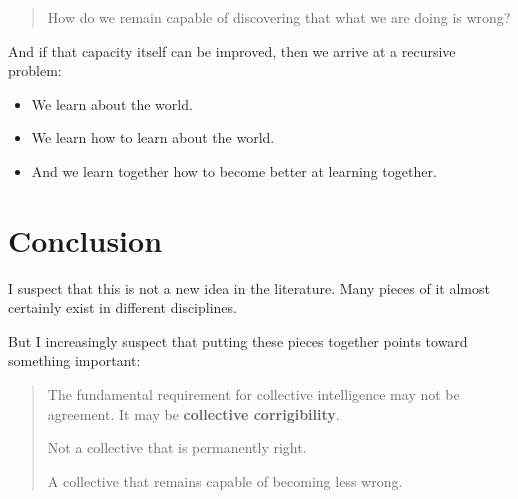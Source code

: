\documentclass{article}
\begin{document}
\begin{quote}
    How do we remain capable of discovering that what we are doing is wrong?
\end{quote}

And if that capacity itself can be improved, then we arrive at a recursive problem:

\begin{itemize}
    \item We learn about the world.
    \item We learn how to learn about the world.
    \item And we learn together how to become better at learning together.
\end{itemize}

\section*{Conclusion}

I suspect that this is not a new idea in the literature. Many pieces of it almost certainly exist in different disciplines.

But I increasingly suspect that putting these pieces together points toward something important:

\begin{quote}
    The fundamental requirement for collective intelligence may not be agreement. It may be \textbf{collective corrigibility}.

    Not a collective that is permanently right.

    A collective that remains capable of becoming less wrong.
\end{quote}
\end{document}
